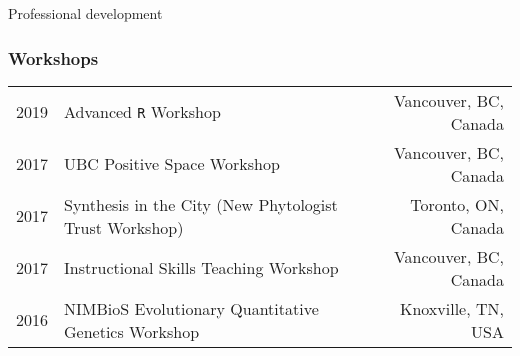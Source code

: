 \documentclass[11pt]{article}
\begin{document}
\noindent \begin{rSection}{Professional development} %

\subsubsection*{Workshops}
\begin{tabular}{llr}

2019 & Advanced \texttt{R} Workshop & Vancouver, BC, Canada\\
2017 & UBC Positive Space Workshop & Vancouver, BC, Canada\\
2017 & Synthesis in the City (New Phytologist Trust Workshop) & Toronto, ON, Canada\\
2017 & Instructional Skills Teaching Workshop & Vancouver, BC, Canada\\
2016 & NIMBioS Evolutionary Quantitative Genetics Workshop & Knoxville, TN, USA

\end{tabular}

\end{rSection}
\vspace{0.5em}
\end{document}
